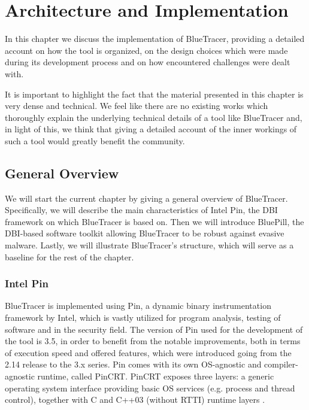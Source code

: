 
\chapter{Architecture and Implementation} \label{implementation}
In this chapter we discuss the implementation of BlueTracer, providing a detailed account on how the tool is organized, on the design choices which were made during its development process and on how encountered challenges were dealt with. 

It is important to highlight the fact that the material presented in this chapter is very dense and technical. We feel like there are no existing works which thoroughly explain the underlying technical details of a tool like BlueTracer and, in light of this, we think that giving a detailed account of the inner workings of such a tool would greatly benefit the community. 

\section{General Overview}

We will start the current chapter by giving a general overview of BlueTracer. Specifically, we will describe the main characteristics of Intel Pin, the DBI framework on which BlueTracer is based on. Then we will introduce BluePill, the DBI-based software toolkit allowing BlueTracer to be robust against evasive malware. Lastly, we will illustrate BlueTracer's structure, which will serve as a baseline for the rest of the chapter.  

\subsection{Intel Pin}
BlueTracer is implemented using Pin, a dynamic binary instrumentation framework by Intel, which is vastly utilized for program analysis, testing of software and in the security field. The version of Pin used for the development of the tool is 3.5, in order to benefit from the notable improvements, both in terms of execution speed and offered features, which were introduced going from the 2.14 release to the 3.x series. Pin comes with its own OS-agnostic and compiler-agnostic runtime, called PinCRT. PinCRT exposes three layers: a generic operating system interface providing basic OS services (e.g. process and thread control), together with C and C++03 (without RTTI) runtime layers \cite{Pin}.

